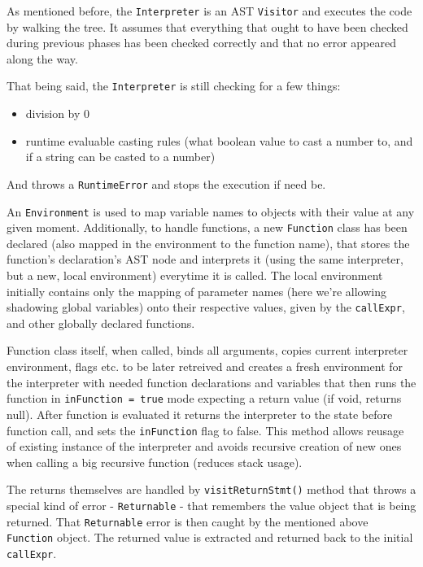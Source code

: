 \documentclass[a4paper,12pt]{article}
\providecommand{\tightlist}{\setlength{\itemsep}{0pt}\setlength{\parskip}{0pt}}
\begin{document}
As mentioned before, the \texttt{Interpreter} is an AST \texttt{Visitor}
and executes the code by walking the tree. It assumes that everything
that ought to have been checked during previous phases has been checked
correctly and that no error appeared along the way. \newline

That being said, the \texttt{Interpreter} is still checking for a few
things:

\begin{itemize}
\tightlist
\item
  division by 0
\item
  runtime evaluable casting rules (what boolean value to cast a number
  to, and if a string can be casted to a number)
\end{itemize}

And throws a \texttt{RuntimeError} and stops the execution if need be.
\newline

An \texttt{Environment} is used to map variable names to objects with
their value at any given moment. Additionally, to handle functions, a
new \texttt{Function} class has been declared (also mapped in the
environment to the function name), that stores the function's
declaration's AST node and interprets it (using the same interpreter,
but a new, local environment) everytime it is called. The local
environment initially contains only the mapping of parameter names (here
we're allowing shadowing global variables) onto their respective values,
given by the \texttt{callExpr}, and other globally declared functions.
\newline

Function class itself, when called, binds all arguments, copies current
interpreter environment, flags etc. to be later retreived and creates a
fresh environment for the interpreter with needed function declarations
and variables that then runs the function in
\texttt{inFunction\ =\ true} mode expecting a return value (if void,
returns null). After function is evaluated it returns the interpreter to
the state before function call, and sets the \texttt{inFunction} flag to
false. This method allows reusage of existing instance of the
interpreter and avoids recursive creation of new ones when calling a big
recursive function (reduces stack usage). \newline

The returns themselves are handled by \texttt{visitReturnStmt()} method
that throws a special kind of error - \texttt{Returnable} - that
remembers the value object that is being returned. That
\texttt{Returnable} error is then caught by the mentioned above
\texttt{Function} object. The returned value is extracted and returned
back to the initial \texttt{callExpr}.
\end{document}
